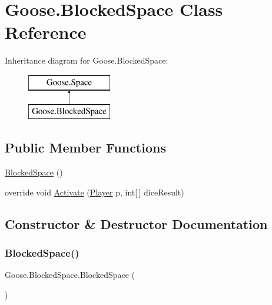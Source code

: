 \hypertarget{class_goose_1_1_blocked_space}{}\section{Goose.\+Blocked\+Space Class Reference}
\label{class_goose_1_1_blocked_space}
Inheritance diagram for Goose.\+Blocked\+Space\+:\begin{figure}[H]
\begin{center}
\leavevmode
\includegraphics[height=2.000000cm]{class_goose_1_1_blocked_space}
\end{center}
\end{figure}
\subsection*{Public Member Functions}
\begin{DoxyCompactItemize}
\item 
\hyperlink{class_goose_1_1_blocked_space_a981ce6bfa0a81dffe40b9ffd87c8fb2f}{Blocked\+Space} ()
\item 
override void \hyperlink{class_goose_1_1_blocked_space_a08ceb6c567dd3e419f129ac04633f206}{Activate} (\hyperlink{class_goose_1_1_player}{Player} p, int\mbox{[}$\,$\mbox{]} dice\+Result)
\end{DoxyCompactItemize}


\subsection{Constructor \& Destructor Documentation}
\mbox{\label{class_goose_1_1_blocked_space_a981ce6bfa0a81dffe40b9ffd87c8fb2f}} 
\subsubsection{\texorpdfstring{Blocked\+Space()}{BlockedSpace()}}
{\footnotesize\ttfamily Goose.\+Blocked\+Space.\+Blocked\+Space (\begin{DoxyParamCaption}{ }\end{DoxyParamCaption})}



